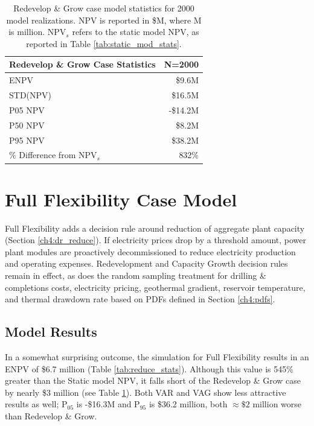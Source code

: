 \begin{table}[H]
\centering
\begin{tabular}{|l|r|}
\hline
\textbf{Redevelop \& Grow Case Statistics} & N=2000 \\ \hline
ENPV & \$9.6M \\ \hline
STD(NPV) & \$16.5M \\ \hline
P05 NPV & -\$14.2M \\ \hline
P50 NPV & \$8.2M \\ \hline
P95 NPV & \$38.2M \\ \hline
\% Difference from NPV$_{s}$ & 832\% \\ \hline
\end{tabular}
\caption[Redevelop \& Grow Case statistics]{Redevelop \& Grow case model statistics for 2000 model realizations. NPV is reported in \$M, where M is million. NPV$_s$ refers to the static model NPV, as reported in Table \ref{tab:static_mod_stats}.}
\label{tab:grow_stats}
\end{table}

\section{Full Flexibility Case Model}
\label{ch6:reduce_case}

Full Flexibility adds a decision rule around reduction of aggregate plant capacity (Section \ref{ch4:dr_reduce}). If electricity prices drop by a threshold amount, power plant modules are proactively decommissioned to reduce electricity production and operating expenses. Redevelopment and Capacity Growth decision rules remain in effect, as does the random sampling treatment for drilling \& completions costs, electricity pricing, geothermal gradient, reservoir temperature, and thermal drawdown rate based on PDFs defined in Section \ref{ch4:pdfs}.

\subsection{Model Results}
\label{ch6:reduce_results}

In a somewhat surprising outcome, the simulation for Full Flexibility results in an ENPV of \$6.7 million (Table \ref{tab:reduce_stats}). Although this value is 545\% greater than the Static model NPV, it falls short of the Redevelop \& Grow case by nearly \$3 million (see Table \ref{tab:grow_stats}). Both VAR and VAG show less attractive results as well; P$_{05}$ is -\$16.3M and P$_{95}$ is \$36.2 million, both $\approx \$2$ million worse than Redevelop \& Grow.  

